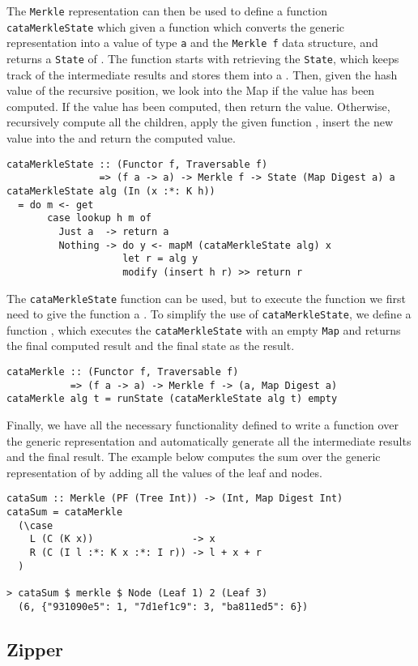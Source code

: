 The \texttt{Merkle} representation can then be used to define a function \texttt{cataMerkleState} which given a function  which converts the generic representation  into a value of type \texttt{a} and the \texttt{Merkle f} data structure, and returns a \texttt{State} of . The  function starts with retrieving the \texttt{State}, which keeps track of the intermediate results and stores them into a . Then, given the hash value of the recursive position, we look into the Map if the value has been computed. If the value has been computed, then return the value. Otherwise, recursively compute all the children, apply the given function , insert the new value into the  and return the computed value.

\begin{verbatim}
cataMerkleState :: (Functor f, Traversable f)
                => (f a -> a) -> Merkle f -> State (Map Digest a) a
cataMerkleState alg (In (x :*: K h)) 
  = do m <- get
       case lookup h m of
         Just a  -> return a
         Nothing -> do y <- mapM (cataMerkleState alg) x
                    let r = alg y
                    modify (insert h r) >> return r
\end{verbatim}

The \texttt{cataMerkleState} function can be used, but to execute the function we first need to give the function a . To simplify the use of \texttt{cataMerkleState}, we define a function , which executes the \texttt{cataMerkleState} with an empty \texttt{Map} and returns the final computed result and the final state as the result. 

\begin{verbatim}
cataMerkle :: (Functor f, Traversable f)
           => (f a -> a) -> Merkle f -> (a, Map Digest a)
cataMerkle alg t = runState (cataMerkleState alg t) empty
\end{verbatim}

Finally, we have all the necessary functionality defined to write a function over the generic representation and automatically generate all the intermediate results and the final result. The example below computes the sum over the generic representation of  by adding all the values of the leaf and nodes. 

\begin{verbatim}
cataSum :: Merkle (PF (Tree Int)) -> (Int, Map Digest Int)
cataSum = cataMerkle
  (\case
    L (C (K x))                 -> x
    R (C (I l :*: K x :*: I r)) -> l + x + r
  )
  
> cataSum $ merkle $ Node (Leaf 1) 2 (Leaf 3)
  (6, {"931090e5": 1, "7d1ef1c9": 3, "ba811ed5": 6})
\end{verbatim}

\subsection{Zipper}